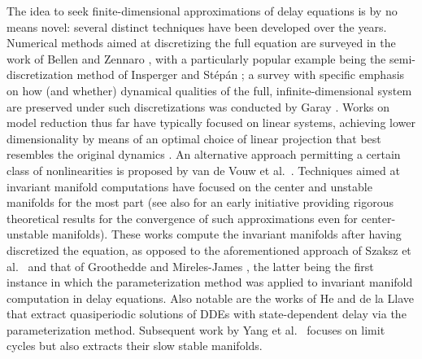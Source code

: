 \documentclass[a4paper, 12pt, oneside, reqno, notitlepage]{amsart}
\theoremstyle{plain}
\theoremstyle{definition}
\theoremstyle{remark}
\begin{document}
The idea to seek finite-dimensional approximations of delay equations is by no means novel: 
several  distinct  techniques have been developed over the years.
Numerical methods aimed at discretizing the full equation are surveyed in the work of Bellen and Zennaro \cite{bellen2013numerical}, with a particularly popular example being the semi-discretization method of Insperger and Stépán \cite{insperger2002semi,insperger2011semi}; a survey with specific emphasis on how (and whether) dynamical qualities of the full, infinite-dimensional system are preserved under such discretizations was conducted by Garay \cite{garay2005brief}.
Works on model reduction thus far have typically focused on linear systems,
achieving lower dimensionality by means of an optimal choice of linear projection that best resembles the original dynamics \cite{michiels2011krylov,beattie2009interpolatory}.
An alternative approach permitting a certain class of nonlinearities is proposed by van de Vouw et al.~\cite{van2015model}.
Techniques aimed at invariant manifold computations have focused on
the center and unstable manifolds for the most part \cite{krauskopf2003computing,green2004one,sahai2009numerical,scarciotti2015model} (see also \cite{farkas2001unstable,farkas2002small} for an early initiative providing rigorous theoretical results for the convergence of such approximations even for  center-unstable manifolds).
These works compute the invariant manifolds after having discretized the equation, as opposed to the aforementioned approach of Szaksz et al.~\cite{szaksz2025spectral} and that of Groothedde and Mireles-James \cite{groothedde2017parameterization}, the latter being the first instance in which the parameterization method was applied to invariant manifold computation in delay equations. 
Also notable are the works of He and de la Llave \cite{he2017construction,he2016construction} that extract quasiperiodic solutions of DDEs  with state-dependent delay  via the parameterization method. Subsequent work by Yang et al.~\cite{yang2021parameterization} focuses on limit cycles but also extracts their slow stable manifolds.
\end{document}
